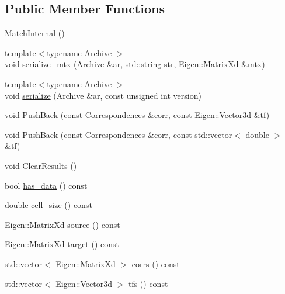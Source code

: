 \subsection*{Public Member Functions}
\begin{DoxyCompactItemize}
\item 
\hyperlink{classcommon_1_1MatchInternal_a9f96197acbfb0dd3969e842b5b51dc21}{Match\+Internal} ()
\item 
{\footnotesize template$<$typename Archive $>$ }\\void \hyperlink{classcommon_1_1MatchInternal_aff0df9eda9d505490b9349bcf91b5a67}{serialize\+\_\+mtx} (Archive \&ar, std\+::string str, Eigen\+::\+Matrix\+Xd \&mtx)
\item 
{\footnotesize template$<$typename Archive $>$ }\\void \hyperlink{classcommon_1_1MatchInternal_a40340e3ee3dd9d70e56078326de9ff88}{serialize} (Archive \&ar, const unsigned int version)
\item 
void \hyperlink{classcommon_1_1MatchInternal_a853a17067e29c199d1680a0dd01a42f9}{Push\+Back} (const \hyperlink{structcommon_1_1Correspondences}{Correspondences} \&corr, const Eigen\+::\+Vector3d \&tf)
\item 
void \hyperlink{classcommon_1_1MatchInternal_ab0ce620f581dd3a33083c03ffbc12ca3}{Push\+Back} (const \hyperlink{structcommon_1_1Correspondences}{Correspondences} \&corr, const std\+::vector$<$ double $>$ \&tf)
\item 
void \hyperlink{classcommon_1_1MatchInternal_a519c8d85ca7a2d31353a3a3ce2e68c34}{Clear\+Results} ()
\item 
bool \hyperlink{classcommon_1_1MatchInternal_aa45d67544518f4cac0b25a12aee78607}{has\+\_\+data} () const
\item 
double \hyperlink{classcommon_1_1MatchInternal_a69a417791950569fed61f59ba3cf79a9}{cell\+\_\+size} () const
\item 
Eigen\+::\+Matrix\+Xd \hyperlink{classcommon_1_1MatchInternal_ab03d9e1343e7363014de8cb08c38ceb8}{source} () const
\item 
Eigen\+::\+Matrix\+Xd \hyperlink{classcommon_1_1MatchInternal_ac84d3e1b4062af44ae7259d2c37f4ef0}{target} () const
\item 
std\+::vector$<$ Eigen\+::\+Matrix\+Xd $>$ \hyperlink{classcommon_1_1MatchInternal_a4a07e3e47fa6885beee71187c85c0eb0}{corrs} () const
\item 
std\+::vector$<$ Eigen\+::\+Vector3d $>$ \hyperlink{classcommon_1_1MatchInternal_a1099ba991441897a0e9879484351cfd0}{tfs} () const

\end{DoxyCompactItemize}
